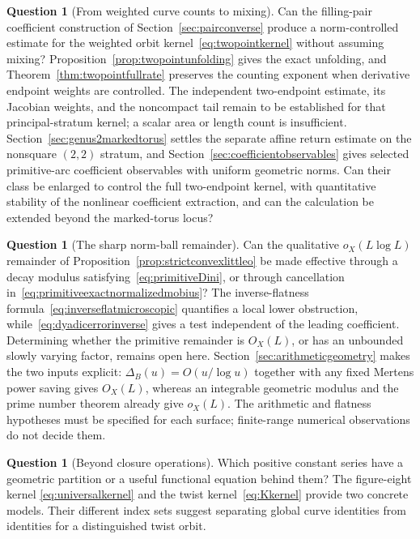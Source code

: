 \documentclass[11pt,a4paper]{article}
\numberwithin{equation}{section}
\theoremstyle{definition}
\newtheorem{question}[theorem]{Question}
\theoremstyle{remark}
\begin{document}
\begin{question}[From weighted curve counts to mixing]
Can the filling-pair coefficient construction of
Section~\ref{sec:pairconverse} produce a norm-controlled estimate
for the weighted orbit kernel~\eqref{eq:twopointkernel} without
assuming mixing? Proposition~\ref{prop:twopointunfolding} gives the
exact unfolding, and Theorem~\ref{thm:twopointfullrate} preserves
the counting exponent when derivative endpoint weights are controlled. The independent
two-endpoint estimate, its Jacobian weights, and the noncompact tail
remain to be established for that principal-stratum kernel; a scalar
area or length count is insufficient. Section~\ref{sec:genus2markedtorus}
settles the separate affine return estimate on the nonsquare $(2,2)$
stratum, and Section~\ref{sec:coefficientobservables} gives selected
primitive-arc coefficient observables with uniform geometric norms.
Can their class be enlarged to control the full two-endpoint kernel,
with quantitative stability of the nonlinear coefficient extraction,
and can the calculation be extended beyond the marked-torus locus?
\end{question}

\begin{question}[The sharp norm-ball remainder]
Can the qualitative $o_X(L\log L)$ remainder of
Proposition~\ref{prop:strictconvexlittleo} be made effective through a
decay modulus satisfying~\eqref{eq:primitiveDini}, or through cancellation
in~\eqref{eq:primitiveexactnormalizedmobius}? The inverse-flatness
formula~\eqref{eq:inverseflatmicroscopic} quantifies a local lower
obstruction, while~\eqref{eq:dyadicerrorinverse} gives a test independent
of the leading coefficient. Determining whether the primitive remainder
is $O_X(L)$, or has an unbounded slowly varying factor, remains open here.
Section~\ref{sec:arithmeticgeometry} makes the two inputs explicit:
$\Delta_B(u)=O(u/\log u)$ together with any fixed Mertens power
saving gives $O_X(L)$, whereas an integrable geometric modulus and
the prime number theorem already give $o_X(L)$.
The arithmetic and flatness hypotheses must be specified for each surface;
finite-range numerical observations do not decide them.
\end{question}

\begin{question}[Beyond closure operations]
Which positive constant series have a geometric partition or a useful
functional equation behind them? The figure-eight kernel
\eqref{eq:universalkernel} and the twist kernel~\eqref{eq:Kkernel} provide
two concrete models. Their different index sets suggest separating
global curve identities from identities for a distinguished twist orbit.
\end{question}
\end{document}

